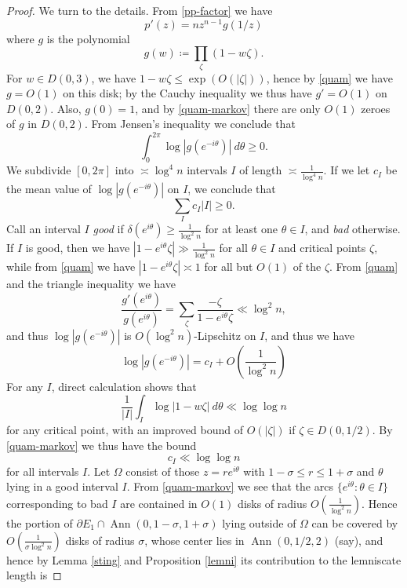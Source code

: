 \documentclass[12pt]{amsart}
\newcommand{\Ann}{\operatorname{Ann}}
\begin{document}
\begin{proof}
We turn to the details.  From \eqref{pp-factor} we have
\begin{equation}\label{p1}
 p'(z) = n z^{n-1} g(1/z)
\end{equation}
where $g$ is the polynomial
$$ g(w) \coloneqq \prod_\zeta \left( 1 - w \zeta \right).$$
For $w \in D(0,3)$, we have $1 - w\zeta \leq \exp( O(|\zeta|) )$, hence by \eqref{quam} we have $g=O(1)$ on this disk; by the Cauchy inequality we thus have $g'=O(1)$ on $D(0,2)$.  Also, $g(0)=1$, and by \eqref{quam-markov} there are only $O(1)$ zeroes of $g$ in $D(0,2)$.  From Jensen's inequality we conclude that
$$ \int_0^{2\pi} \log |g(e^{-i\theta})|\ d\theta \geq 0.$$
We subdivide $[0,2\pi]$ into $\asymp \log^4 n$ intervals $I$ of length $\asymp \frac{1}{\log^4 n}$.  If we let $c_I$ be the mean value of $\log |g(e^{-i\theta})|$ on $I$, we conclude that
\begin{equation}\label{sumi}
 \sum_I c_I |I| \geq 0.
\end{equation}
Call an interval $I$ \emph{good} if $\delta(e^{i\theta}) \geq \frac{1}{\log^2 n}$ for at least one $\theta \in I$, and \emph{bad} otherwise.  If $I$ is good, then we have $|1- e^{i\theta} \zeta| \gg \frac{1}{\log^2 n}$ for all $\theta \in I$ and critical points $\zeta$, while from \eqref{quam} we have $|1 - e^{i\theta} \zeta| \asymp 1$ for all but $O(1)$ of the $\zeta$. From \eqref{quam} and the triangle inequality we have
\begin{equation}\label{gpp}
 \frac{g'(e^{i\theta})}{g(e^{i\theta})} = \sum_\zeta \frac{-\zeta}{1 - e^{i\theta} \zeta} \ll \log^2 n,
\end{equation}
and thus $\log |g(e^{-i\theta})|$ is $O(\log^2 n)$-Lipschitz on $I$, and thus we have
\begin{equation}\label{loggi}
    \log |g(e^{-i\theta})| = c_I + O\left(\frac{1}{\log^2 n}\right)
\end{equation}
For any $I$, direct calculation shows that
$$ \frac{1}{|I|} \int_I \log |1-w\zeta|\ d\theta \ll \log\log n$$
for any critical point, with an improved bound of $O(|\zeta|)$ if $\zeta \in D(0,1/2)$.  By \eqref{quam-markov} we thus have the bound
\begin{equation}\label{cilog}
     c_I \ll \log\log n
\end{equation}
for all intervals $I$.
Let $\Omega$ consist of those $z = re^{i\theta}$ with $1-\sigma \leq r \leq 1+\sigma$ and $\theta$ lying in a good interval $I$.
From \eqref{quam-markov} we see that the arcs $\{e^{i\theta}: \theta \in I\}$ corresponding to bad $I$ are contained in $O(1)$ disks of radius $O(\frac{1}{\log^2 n})$.  Hence the portion of $\partial E_1 \cap \Ann(0,1-\sigma,1+\sigma)$ lying outside of $\Omega$ can be covered by $O(\frac{1}{\sigma \log^2 n})$ disks of radius $\sigma$, whose center lies in $\Ann(0,1/2,2)$ (say), and hence by Lemma \ref{sting} and Proposition \ref{lemni} its contribution to the lemniscate length is

\end{proof}
\end{document}
